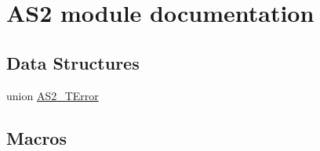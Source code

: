 \hypertarget{group___a_s2__module}{}\section{A\+S2 module documentation}
\label{group___a_s2__module}
\subsection*{Data Structures}
\begin{DoxyCompactItemize}
\item 
union \hyperlink{union_a_s2___t_error}{A\+S2\+\_\+\+T\+Error}
\end{DoxyCompactItemize}
\subsection*{Macros}
